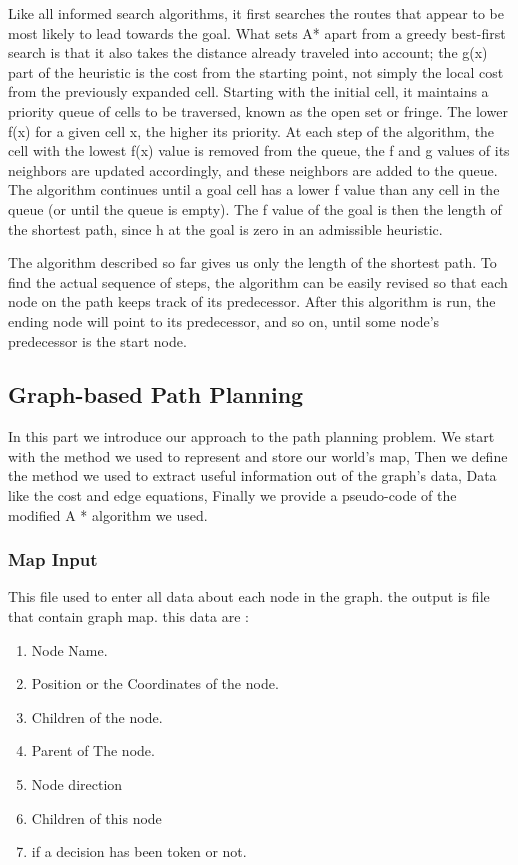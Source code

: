 Like all informed search algorithms, it first searches the routes that appear to be most likely to lead towards the goal. What sets A* apart from a greedy best-first search is that it also takes the distance already traveled into account; the g(x) part of the heuristic is the cost from the starting point, not simply the local cost from the previously expanded cell. Starting with the initial cell, it maintains a priority queue of cells to be traversed, known as the open set or fringe. The lower f(x) for a given cell x, the higher its priority. At each step of the algorithm, the cell with the lowest f(x) value is removed from the queue, the f and g values of its neighbors are updated accordingly, and these neighbors are added to the queue. The algorithm continues until a goal cell has a lower f value than any cell in the queue (or until the queue is empty). The f value of the goal is then the length of the shortest path, since h at the goal is zero in an admissible heuristic. \newline

The algorithm described so far gives us only the length of the shortest path. To find the actual sequence of steps, the algorithm can be easily revised so that each node on the path keeps track of its predecessor. After this algorithm is run, the ending node will point to its predecessor, and so on, until some node's predecessor is the start node.

\subsection{Graph-based Path Planning}
\hspace{2cm}In this part we introduce our approach to the path planning problem. We start with the method we used to represent and store our world's map, Then we define the method we used to extract useful information out of the graph's data, Data like the cost and edge equations, Finally we provide a pseudo-code of the modified A * algorithm we used.
\subsubsection{Map Input}
This file used to enter all data about each node in the graph. the output is file that contain graph map.
this data are :
 \begin{enumerate}
    \setcounter{enumi}{0}
    \item Node Name.
    \item Position or the Coordinates of the node.
    \item Children of the node.
    \item Parent of The node.
    \item Node direction
    \item Children of this node
    \item  if a decision has been token or not.
    \end{enumerate}
